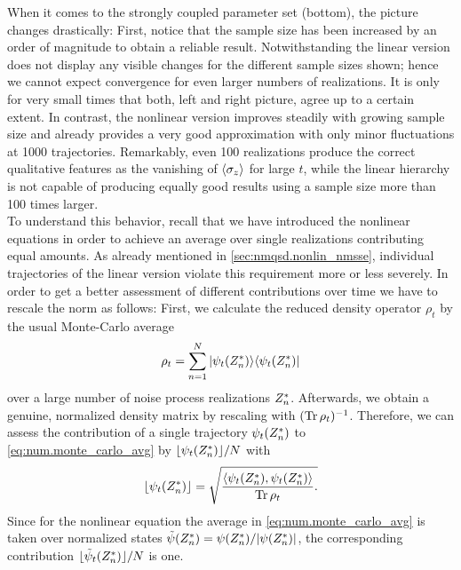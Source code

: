 When it comes to the strongly coupled parameter set (bottom), the picture changes drastically:
First, notice that the sample size has been increased by an order of magnitude to obtain a reliable result.
Notwithstanding the linear version does not display any visible changes for the different sample sizes shown; hence we cannot expect convergence for even larger numbers of realizations.
It is only for very small times that both, left and right picture, agree up to a certain extent.
In contrast, the nonlinear version improves steadily with growing sample size and already provides a very good approximation with only minor fluctuations at 1000 trajectories.
Remarkably, even 100 realizations produce the correct qualitative features as the vanishing of $\langle \sigma_z \rangle$ for large $t$, while the linear hierarchy is not capable of producing equally good results using a sample size more than 100 times larger.\\



To understand this behavior, recall that we have introduced the nonlinear equations in order to achieve an average over single realizations contributing equal amounts.
As already mentioned in \autoref{sec:nmqsd.nonlin_nmsse}, individual trajectories of the linear version violate this requirement more or less severely.
In order to get a better assessment of different contributions over time we have to rescale the norm as follows:
First, we calculate the reduced density operator $\rho_t$ by the usual Monte-Carlo average
\begin{equation}
  \rho_t = \sum_{n=1}^N | \psi_t({Z}^*_n) \rangle \langle \psi_t({Z}^*_n) |
  \label{eq:num.monte_carlo_avg}
\end{equation}
over a large number of noise process realizations ${Z}^*_n$.
Afterwards, we obtain a genuine, normalized density matrix by rescaling with $(\operatorname{Tr}{} \rho_t)^{-1}$.
Therefore, we can assess the contribution of a single trajectory $\psi_t({Z}^*_n)$ to \autoref{eq:num.monte_carlo_avg} by $\lfloor \psi_t({Z}^*_n) \rfloor / N$ with
\begin{equation}
  \lfloor \psi_t(\ZZ_n) \rfloor = \sqrt{%
    \frac{\sp{\psi_t(\ZZ_n)}{\psi_t(\ZZ_n)}}{\Tr{} \rho_t}.
  }
  \label{eq:num.contribution}
\end{equation}
Since for the nonlinear equation the average in \autoref{eq:num.monte_carlo_avg} is taken over normalized states $\tilde\psi({Z}^*_n) = \psi({Z}^*_n) / \vert \psi({Z}^*_n) \vert$, the corresponding contribution $\lfloor \tilde\psi_t({Z}^*_n) \rfloor / N$ is one.

